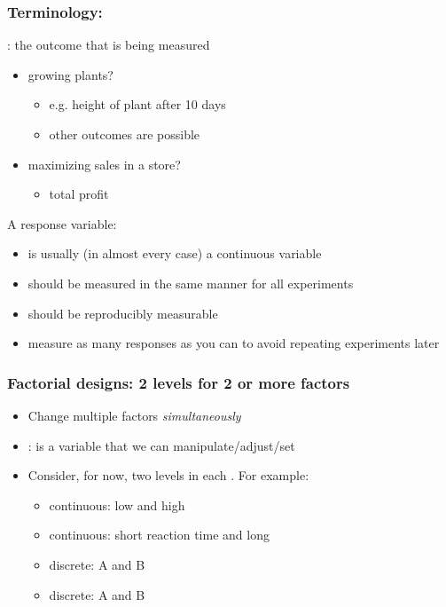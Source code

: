 \begin{frame}\frametitle{Terminology: {\color{purple}{Response}}}
	{\color{purple}{Response}}: the outcome that is being measured
	\begin{itemize}
		\item	growing plants? 
			\begin{itemize}
				\item	e.g. height of plant after 10 days
				\item	other outcomes are possible
			\end{itemize}
		\item	maximizing sales in a store? 
			\begin{itemize}
				\item	total profit
			\end{itemize}
	\end{itemize}
	
	\vspace{12pt}
	A response variable:
	\begin{itemize}
		\item	is usually (in almost every case) a continuous variable
		\item	should be measured in the same manner for all experiments
		\item	should be reproducibly measurable
		\item	measure as many responses as you can to avoid repeating experiments later
	\end{itemize}	
\end{frame}

\begin{frame}\frametitle{Factorial designs: 2 levels for 2 or more factors}
	\begin{itemize}
		\item	Change multiple factors \emph{simultaneously}
		\item	{\color{purple}{Factor}}: is a variable that we can manipulate/adjust/set
		\item	Consider, for now, two levels in each \textbf{{\color{myOrange}{factor}}}. For example:
		\begin{itemize}
			
			\item	continuous: low and high {\color{myOrange}{pH}}
			\item	continuous: short reaction time and long {\color{myOrange}{reaction time}}
			\item	discrete: {\color{myOrange}{catalyst}} A and B
			\item	discrete: {\color{myOrange}{mixing system}} A and B
		\end{itemize}
	\end{itemize}
\end{frame}

